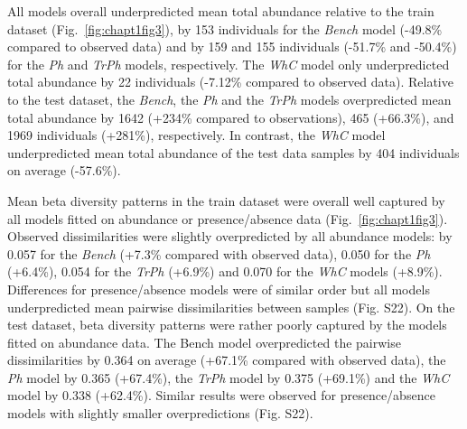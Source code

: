 \begin{refsection}
All models overall underpredicted mean total abundance relative to the
train dataset (Fig.~\ref{fig:chapt1fig3}), by 153 individuals for the
\emph{Bench} model (-49.8\% compared to observed data) and by 159 and
155 individuals (-51.7\% and -50.4\%) for the \emph{Ph} and \emph{TrPh}
models, respectively. The \emph{WhC} model only underpredicted total
abundance by 22 individuals (-7.12\% compared to observed data).
Relative to the test dataset, the \emph{Bench}, the \emph{Ph} and the
\emph{TrPh} models overpredicted mean total abundance by 1642 (+234\%
compared to observations), 465 (+66.3\%), and 1969 individuals (+281\%),
respectively. In contrast, the \emph{WhC} model underpredicted mean
total abundance of the test data samples by 404 individuals on average
(-57.6\%).

Mean beta diversity patterns in the train dataset were overall well
captured by all models fitted on abundance or presence/absence data
(Fig.~\ref{fig:chapt1fig3}). Observed dissimilarities were slightly
overpredicted by all abundance models: by 0.057 for the \emph{Bench}
(+7.3\% compared with observed data), 0.050 for the \emph{Ph} (+6.4\%),
0.054 for the \emph{TrPh} (+6.9\%) and 0.070 for the \emph{WhC} models
(+8.9\%). Differences for presence/absence models were of similar order
but all models underpredicted mean pairwise dissimilarities between
samples (Fig. S22). On the test dataset, beta diversity patterns were
rather poorly captured by the models fitted on abundance data. The Bench
model overpredicted the pairwise dissimilarities by 0.364 on average
(+67.1\% compared with observed data), the \emph{Ph} model by 0.365
(+67.4\%), the \emph{TrPh} model by 0.375 (+69.1\%) and the \emph{WhC}
model by 0.338 (+62.4\%). Similar results were observed for
presence/absence models with slightly smaller overpredictions (Fig.
S22).


\end{refsection}
